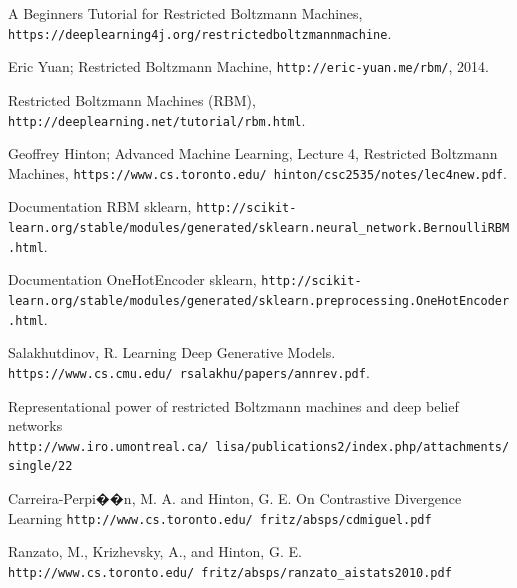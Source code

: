 \documentclass[12pt,a4paper,openright,oneside]{article}
\numberwithin{equation}{section}
\theoremstyle{definition}
\begin{document}
\begin{thebibliography}{25}
 A Beginner\textsc{}s Tutorial for Restricted Boltzmann Machines,  \newline \texttt{https://deeplearning4j.org/restrictedboltzmannmachine}.

 Eric Yuan; Restricted Boltzmann Machine,  \newline \texttt{http://eric-yuan.me/rbm/}, 2014.

 Restricted Boltzmann Machines (RBM),  \newline \texttt{http://deeplearning.net/tutorial/rbm.html}.

 Geoffrey Hinton; Advanced Machine Learning, Lecture 4, Restricted Boltzmann Machines,  \newline \texttt{https://www.cs.toronto.edu/~hinton/csc2535/notes/lec4new.pdf}.

 Documentation RBM sklearn,  \newline \texttt{http://scikit-learn.org/stable/modules/generated/sklearn.neural\_network.BernoulliRBM.html}.

 Documentation OneHotEncoder sklearn,  \newline \texttt{http://scikit-learn.org/stable/modules/generated/sklearn.preprocessing.OneHotEncoder.html}.

Salakhutdinov, R. Learning Deep Generative Models. \newline \texttt{https://www.cs.cmu.edu/~rsalakhu/papers/annrev.pdf}.

 Representational power of restricted Boltzmann machines and
deep belief networks \newline \texttt{http://www.iro.umontreal.ca/~lisa/publications2/index.php/attachments/single/22}

 Carreira-Perpi��n, M. A. and Hinton, G. E. On Contrastive Divergence Learning \newline \texttt{http://www.cs.toronto.edu/~fritz/absps/cdmiguel.pdf}

 Ranzato, M., Krizhevsky, A., and Hinton, G. E. \newline \texttt{http://www.cs.toronto.edu/~fritz/absps/ranzato\_aistats2010.pdf}
\end{thebibliography}
\end{document}
